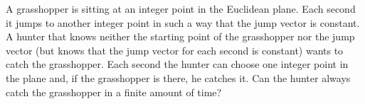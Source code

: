 A grasshopper is sitting at an integer point in the Euclidean plane. Each second it jumps to another integer point in such a way that the jump vector is constant. A hunter that knows neither the starting point of the grasshopper nor the jump vector (but knows that the jump vector for each second is constant) wants to catch the grasshopper. Each second the hunter can choose one integer point in the plane and, if the grasshopper is there, he catches it. Can the hunter always catch the grasshopper in a finite amount of time?